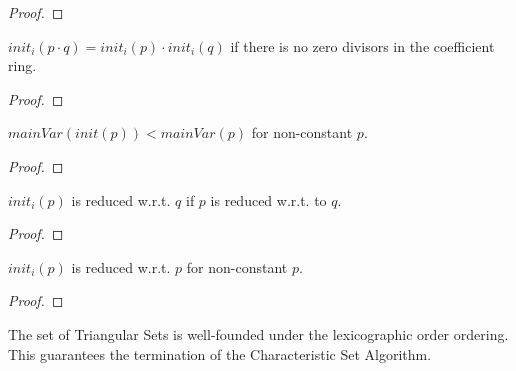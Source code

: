 \begin{proof}
    \leanok
\end{proof}

\begin{theorem}
    \label{thm:initialOf_mul_eq}
    \leanok
    $init_i(p \cdot q) = init_i(p) \cdot init_i(q)$ if there is no zero divisors in the coefficient ring.
\end{theorem}

\begin{proof}
    \leanok
\end{proof}

\begin{lemma}
    \label{lem:max_vars_initial_lt}
    \leanok
    $mainVar(init(p)) < mainVar(p)$ for non-constant $p$.
\end{lemma}

\begin{proof}
    \leanok
\end{proof}

\begin{lemma}
    \label{lem:initial_reducedTo}
    \leanok
    $init_i(p)$ is reduced w.r.t. $q$ if $p$ is reduced w.r.t. to $q$.
\end{lemma}

\begin{proof}
    \leanok
\end{proof}

\begin{lemma}
    \label{lem:initial_reducedTo_self}
    \leanok
    $init_i(p)$ is reduced w.r.t. $p$ for non-constant $p$.
\end{lemma}

\begin{proof}
    \leanok
\end{proof}

\begin{theorem}
    \label{inst:TriangularSet.instWellFoundedLT}
    \leanok
    The set of Triangular Sets is well-founded under the lexicographic order ordering. This guarantees the termination of the Characteristic Set Algorithm.
\end{theorem}

